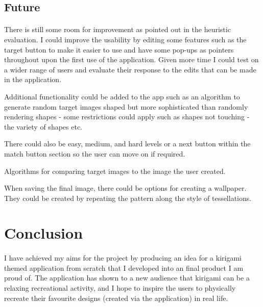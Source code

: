 \documentclass[11pt]{article}
\begin{document}
    \subsection{Future}
        
                \paragraph{}
                
                There is still some room for improvement as pointed out in the heuristic evaluation. I could improve the usability by editing some features such as the target button to make it easier to use and have some pop-ups as pointers throughout upon the first use of the application. Given more time I could test on a wider range of users and evaluate their response to the edits that can be made in the application. 
                
                Additional functionality could be added to the app such as an algorithm to generate random target images shaped but more sophisticated than randomly rendering shapes - some restrictions could apply such as shapes not touching - the variety of shapes etc.
                
                There could also be easy, medium, and hard levels or a next button within the match button section so the user can move on if required. 
                
                Algorithms for comparing target images to the image the user created.

                When saving the final image, there could be options for creating a wallpaper. They could be created by repeating the pattern
                along the style of tessellations. 

\newpage
\section{Conclusion}
        
            \paragraph{}

            I have achieved my aims for the project by producing an idea for a kirigami themed application from scratch that I developed into an final product I am proud of. The application has shown to a new audience that kirigami can be a relaxing recreational activity, and I hope to inspire the users to physically recreate their favourite designs (created via the application) in real life.
            
\end{document}
